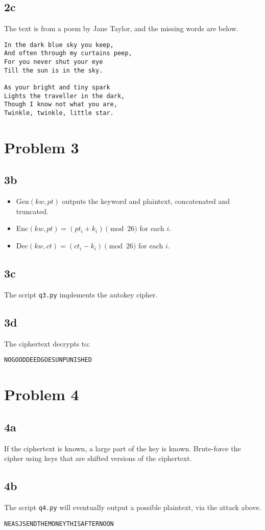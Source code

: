 \documentclass[letterpaper, 12pt]{article}
\begin{document}
\subsection*{2c}
The text is from a poem by Jane Taylor, and the missing words are below.
\begin{Verbatim}[frame=single]
In the dark blue sky you keep,
And often through my curtains peep,
For you never shut your eye
Till the sun is in the sky.

As your bright and tiny spark
Lights the traveller in the dark,
Though I know not what you are,
Twinkle, twinkle, little star.
\end{Verbatim}

\section*{Problem 3}
\subsection*{3b}
\begin{itemize}
	\item Gen\((kw, pt)\) outputs the keyword and plaintext, concatenated and truncated.
	\item Enc\((kw, pt) = (pt_i + k_i)\pmod{26}\) for each \(i\).
	\item Dec\((kw, ct) = (ct_i - k_i)\pmod{26}\) for each \(i\).
\end{itemize}

\subsection*{3c}
The script \texttt{q3.py} implements the autokey cipher.

\subsection*{3d}
The ciphertext decrypts to:
\begin{Verbatim}[frame=single]
NOGOODDEEDGOESUNPUNISHED
\end{Verbatim}

\section*{Problem 4}
\subsection*{4a}
If the ciphertext is known, a large part of the key is known. Brute-force the cipher using keys that are shifted versions of the ciphertext.

\subsection*{4b}
The script \texttt{q4.py} will eventually output a possible plaintext, via the attack above.
\begin{Verbatim}[frame=single]
NEASJSENDTHEMONEYTHISAFTERNOON
\end{Verbatim}
\end{document}
